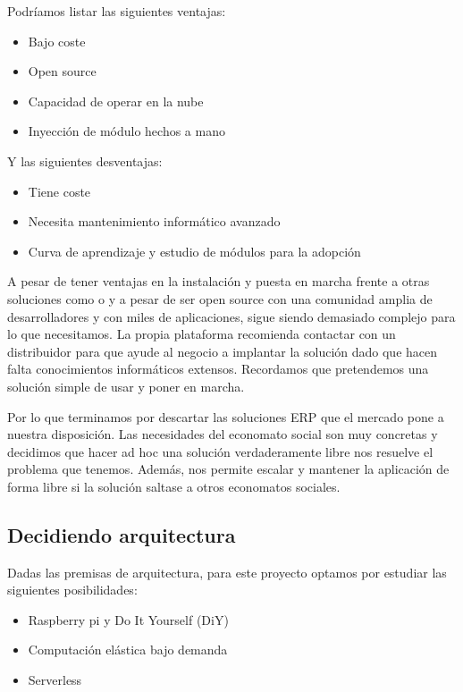 \par Podríamos listar las siguientes ventajas:
\begin{itemize}
    \item Bajo coste
    \item Open source
    \item Capacidad de operar en la nube
    \item Inyección de módulo hechos a mano
\end{itemize}
Y las siguientes desventajas:
\begin{itemize}
    \item Tiene coste
    \item Necesita mantenimiento informático avanzado
    \item Curva de aprendizaje y estudio de módulos para la adopción
\end{itemize}
\par A pesar de tener ventajas en la instalación y puesta en marcha frente a otras soluciones como \citep{oracleERP} o \citep{sapERP} y a pesar de ser open source con una comunidad amplia de desarrolladores y con miles de aplicaciones, sigue siendo demasiado complejo para lo que necesitamos. La propia plataforma recomienda contactar con un distribuidor para que ayude al negocio a implantar la solución dado que hacen falta conocimientos informáticos extensos. Recordamos que pretendemos una solución simple de usar y poner en marcha.
\par Por lo que terminamos por descartar las soluciones ERP que el mercado pone a nuestra disposición. Las necesidades del economato social son muy concretas y decidimos que hacer ad hoc una solución verdaderamente libre nos resuelve el problema que tenemos. Además, nos permite escalar y mantener la aplicación de forma libre si la solución saltase a otros economatos sociales.
\clearpage
\subsection{Decidiendo arquitectura}
Dadas las premisas de arquitectura, para este proyecto optamos por estudiar las siguientes posibilidades:
\begin{itemize}
    \item Raspberry pi y Do It Yourself (DiY)
    \item Computación elástica bajo demanda
    \item Serverless
\end{itemize}
